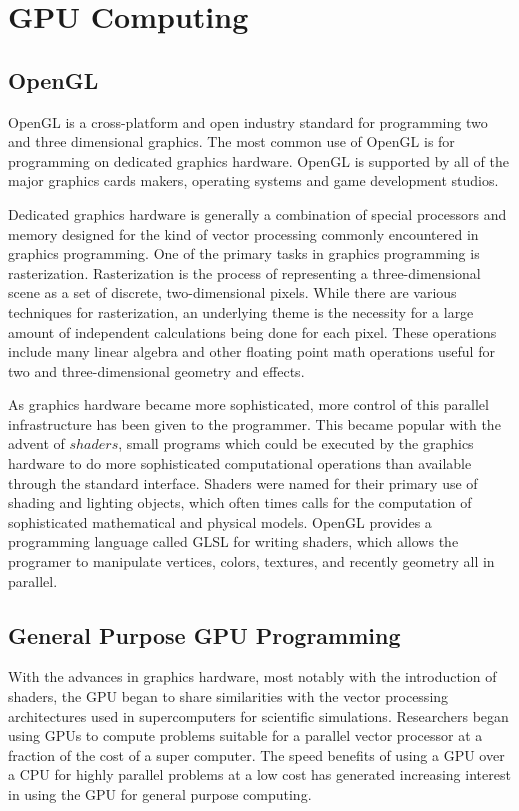 \chapter{GPU Computing}

\section{OpenGL}
OpenGL is a cross-platform and open industry standard for programming two and
three dimensional graphics.\cite{OpenGL} The most common use of OpenGL is for programming on
dedicated graphics hardware. OpenGL is supported by all of the major graphics
cards makers, operating systems and game development studios.


Dedicated graphics hardware is generally a combination of special processors
and memory designed for the kind of vector processing commonly encountered in
graphics programming. One of the primary tasks in graphics programming is
rasterization. Rasterization is the process of representing a three-dimensional
scene as a set of discrete, two-dimensional pixels. While there are various
techniques for rasterization, an underlying theme is the necessity for a large
amount of independent calculations being done for each pixel. These operations
include many linear algebra and other floating point math operations useful for
two and three-dimensional geometry and effects.\cite{Luebke2007}


As graphics hardware became more sophisticated, more control of this parallel
infrastructure has been given to the programmer. This became popular with the
advent of $shaders$, small programs which could be executed by the graphics
hardware to do more sophisticated computational operations than available
through the standard interface. Shaders were named for their primary use of
shading and lighting objects, which often times calls for the computation of
sophisticated mathematical and physical models. OpenGL provides a programming
language called GLSL for writing shaders, which allows the programer to
manipulate vertices, colors, textures, and recently geometry all in parallel.\cite{Luebke2007}


\section{General Purpose GPU Programming}


With the advances in graphics hardware, most notably with the introduction of
shaders, the GPU began to share similarities with the vector processing
architectures used in supercomputers for scientific simulations. Researchers
began using GPUs to compute problems suitable for a parallel vector processor
at a fraction of the cost of a super computer. The speed benefits of using a
GPU over a CPU for highly parallel problems at a low cost has generated
increasing interest in using the GPU for general purpose computing.\cite{Owens2007}


